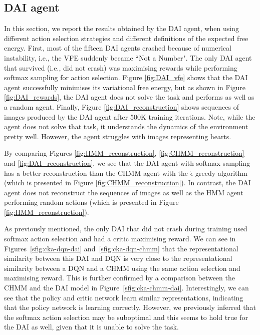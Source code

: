 \documentclass[twoside,11pt]{article}
\begin{document}
\subsection{DAI agent} \label{ssec:dai_results}

In this section, we report the results obtained by the DAI agent, when using different action selection strategies and different definitions of the expected free energy. First, most of the fifteen DAI agents crashed because of numerical instability, i.e., the VFE suddenly became ``Not a Number". The only DAI agent that survived (i.e., did not crash) was maximising rewards while performing softmax sampling for action selection. Figure \ref{fig:DAI_vfe} shows that the DAI agent successfully minimises its variational free energy, but as shown in Figure \ref{fig:DAI_rewards}, the DAI agent does not solve the task and performs as well as a random agent. Finally, Figure \ref{fig:DAI_reconstruction} shows sequences of images produced by the DAI agent after 500K training iterations. Note, while the agent does not solve that task, it understands the dynamics of the environment pretty well. However, the agent struggles with images representing hearts.

By comparing Figures \ref{fig:HMM_reconstruction}, \ref{fig:CHMM_reconstruction} and \ref{fig:DAI_reconstruction}, we see that the DAI agent with softmax sampling has a better reconstruction than the CHMM agent with the $\mathring{\epsilon}$-greedy algorithm (which is presented in Figure \ref{fig:CHMM_reconstruction}). In contrast, the DAI agent does not reconstruct the sequences of images as well as the HMM agent performing random actions (which is presented in Figure \ref{fig:HMM_reconstruction}).

As previously mentioned, the only DAI that did not crash during training used softmax action selection and had a critic maximising reward. We can see in Figures~\ref{sfig:cka-dqn-dai} and~\ref{sfig:cka-dqn-chmm} that the representational similarity between this DAI and DQN is very close to the representational similarity between a DQN and a CHMM using the same action selection and maximising reward. This is further confirmed by a comparison between the CHMM and the DAI model in Figure~\ref{sfig:cka-chmm-dai}. Interestingly, we can see that the policy and critic network learn similar representations, indicating that the policy network is learning correctly. However, we previously inferred that the softmax action selection may be suboptimal and this seems to hold true for the DAI as well, given that it is unable to solve the task.
\end{document}

